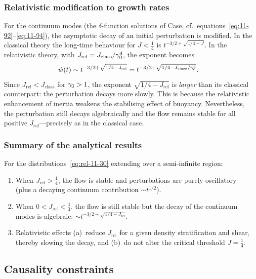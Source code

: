 \subsubsection{Relativistic modification to growth rates}
For the continuum modes (the $\delta$-function solutions of Case,
cf.\ equations~\eqref{eq:11-92}--\eqref{eq:11-94}), the asymptotic
decay of an initial perturbation is modified.  In the classical
theory the long-time behaviour for $J<\frac{1}{4}$ is
$t^{-3/2+\sqrt{1/4-J}}$.  In the relativistic theory, with
$J_{\mathrm{rel}}=J_{\mathrm{class}}/\gamma_{0}^{4}$, the exponent
becomes
\begin{equation}
\label{eq:rel-11-36}
\hat{w}(t) \sim t^{-3/2+\sqrt{1/4-J_{\mathrm{rel}}}}
= t^{-3/2+\sqrt{1/4-J_{\mathrm{class}}/\gamma_{0}^{4}}}.
\end{equation}
Since $J_{\mathrm{rel}}<J_{\mathrm{class}}$ for $\gamma_{0}>1$, the
exponent $\sqrt{1/4-J_{\mathrm{rel}}}$ is \emph{larger} than its
classical counterpart: the perturbation decays more slowly.  This is
because the relativistic enhancement of inertia weakens the stabilising
effect of buoyancy.  Nevertheless, the perturbation still decays
algebraically and the flow remains stable for all positive
$J_{\mathrm{rel}}$---precisely as in the classical case.

\subsubsection{Summary of the analytical results}
For the distributions~\eqref{eq:rel-11-30} extending over a
semi-infinite region:
\begin{enumerate}
\item When $J_{\mathrm{rel}}>\frac{1}{4}$, the flow is stable and
  perturbations are purely oscillatory (plus a decaying continuum
  contribution $\sim t^{1/2}$).
\item When $0 < J_{\mathrm{rel}} < \frac{1}{4}$, the flow is still
  stable but the decay of the continuum modes is algebraic:
  $\sim t^{-3/2+\sqrt{1/4-J_{\mathrm{rel}}}}$.
\item Relativistic effects (a)~reduce $J_{\mathrm{rel}}$ for a given
  density stratification and shear, thereby slowing the decay, and
  (b)~do not alter the critical threshold $J=\frac{1}{4}$.
\end{enumerate}

\subsection{Causality constraints}
\label{sec:rel-103-causality}

